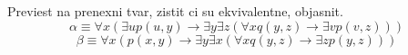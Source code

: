 Previest na prenexni tvar, zistit ci su ekvivalentne, objasnit.
$$\alpha \equiv \forall x (\exists u p(u,y) \rightarrow \exists y \exists
z(\forall x q(y,z) \rightarrow \exists v p(v,z)))$$
$$\beta \equiv \forall x (p(x,y) \rightarrow \exists y \exists x(\forall x
q(y,z) \rightarrow \exists z p(y,z)))$$
